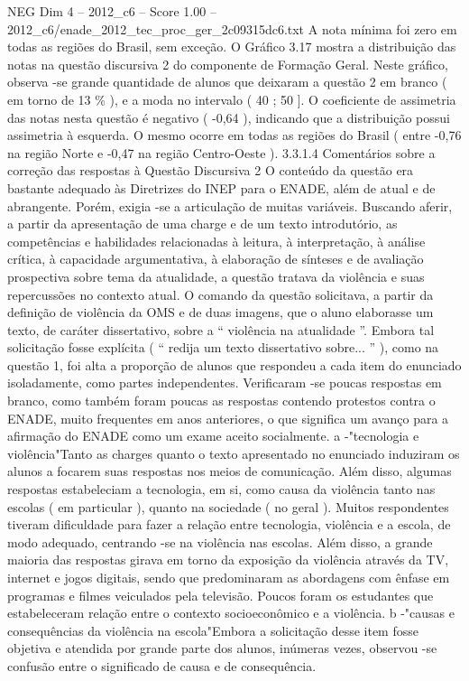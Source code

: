 \begin{textsample}{NEG Dim 4 – 2012\_c6 – Score 1.00 – 2012\_c6/enade\_2012\_tec\_proc\_ger\_2c09315dc6.txt}
A nota mínima foi zero em todas as regiões do Brasil, sem exceção.
O Gráfico 3.17 mostra a distribuição das notas na questão discursiva 2 do componente de Formação Geral.
Neste gráfico, observa -se grande quantidade de alunos que deixaram a questão 2 em branco ( em torno de 13 \% ), e a moda no intervalo ( 40 ; 50 ].
O coeficiente de assimetria das notas nesta questão é negativo ( -0,64 ), indicando que a distribuição possui assimetria à esquerda.
O mesmo ocorre em todas as regiões do Brasil ( entre -0,76 na região Norte e -0,47 na região Centro-Oeste ). 3.3.1.4 Comentários sobre a correção das respostas à Questão Discursiva 2 O conteúdo da questão era bastante adequado às Diretrizes do INEP para o ENADE, além de atual e de abrangente.
Porém, exigia -se a articulação de muitas variáveis.
Buscando aferir, a partir da apresentação de uma charge e de um texto introdutório, as competências e habilidades relacionadas à leitura, à interpretação, à análise crítica, à capacidade argumentativa, à elaboração de sínteses e de avaliação prospectiva sobre tema da atualidade, a questão tratava da violência e suas repercussões no contexto atual.
O comando da questão solicitava, a partir da definição de violência da OMS e de duas imagens, que o aluno elaborasse um texto, de caráter dissertativo, sobre a “ violência na atualidade ”.
Embora tal solicitação fosse explícita ( “ redija um texto dissertativo sobre... ” ), como na questão 1, foi alta a proporção de alunos que respondeu a cada item do enunciado isoladamente, como partes independentes.
Verificaram -se poucas respostas em branco, como também foram poucas as respostas contendo protestos contra o ENADE, muito frequentes em anos anteriores, o que significa um avanço para a afirmação do ENADE como um exame aceito socialmente. a -"tecnologia e violência"Tanto as charges quanto o texto apresentado no enunciado induziram os alunos a focarem suas respostas nos meios de comunicação.
Além disso, algumas respostas estabeleciam a tecnologia, em si, como causa da violência tanto nas escolas ( em particular ), quanto na sociedade ( no geral ).
Muitos respondentes tiveram dificuldade para fazer a relação entre tecnologia, violência e a escola, de modo adequado, centrando -se na violência nas escolas.
Além disso, a grande maioria das respostas girava em torno da exposição da violência através da TV, internet e jogos digitais, sendo que predominaram as abordagens com ênfase em programas e filmes veiculados pela televisão.
Poucos foram os estudantes que estabeleceram relação entre o contexto socioeconômico e a violência. b -"causas e consequências da violência na escola"Embora a solicitação desse item fosse objetiva e atendida por grande parte dos alunos, inúmeras vezes, observou -se confusão entre o significado de causa e de consequência.

\end{textsample}
